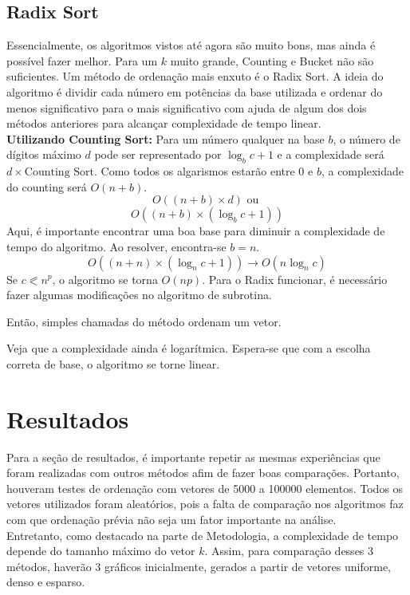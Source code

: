 \documentclass[fontsize=11pt]{article}
\begin{document}
    \subsection{Radix Sort}
        Essencialmente, os algoritmos vistos até agora são muito bons, mas ainda é possível fazer melhor.
        Para um $k$ muito grande, Counting e Bucket não são suficientes. Um método de ordenação
        mais enxuto é o Radix Sort. A ideia do algoritmo é dividir cada número em potências da 
        base utilizada e ordenar do menos significativo para o mais significativo com ajuda 
        de algum dos dois métodos anteriores para alcançar complexidade de tempo linear.
        \\ \textbf{Utilizando Counting Sort:} 
        Para um número qualquer na base $b$, o número de dígitos máximo $d$ pode ser representado 
        por $\log_bc+1$ e a complexidade será $d\times \text{Counting Sort}$. Como todos
        os algarismos estarão entre $0$ e $b$, a complexidade do counting será $O(n+b)$. 
        $$O((n+b)\times d) \text{ ou }$$ $$O((n+b)\times (\log_bc+1))$$
        Aqui, é importante encontrar uma boa base para diminuir a complexidade de tempo
        do algoritmo. Ao resolver, encontra-se $b=n$. \label{radix}
        $$O((n+n)\times (\log_nc+1)) \rightarrow O(n \log_nc)$$ Se $c \eqslantless n^{p}$, o algoritmo 
        se torna $O(np)$. \cite{mitvideo}
        Para o Radix funcionar, é necessário fazer algumas modificações no algoritmo de subrotina.
        
        Então, simples chamadas do método ordenam um vetor. 
        
        Veja que a complexidade ainda é logarítmica. Espera-se que com a escolha 
        correta de base, o algoritmo se torne linear. 

\section{Resultados}
    Para a seção de resultados, é importante repetir as mesmas experiências que foram realizadas com
    outros métodos afim de fazer boas comparações. Portanto, houveram testes de ordenação com vetores 
    de 5000 a 100000 elementos. Todos os vetores utilizados foram aleatórios, pois a falta de comparação
    nos algoritmos faz com que ordenação prévia não seja um fator importante na análise. 
    \\ Entretanto, como destacado na parte de Metodologia, a complexidade de tempo depende do 
    tamanho máximo do vetor $k$. Assim, para comparação desses 3 métodos, haverão 3 gráficos inicialmente,
    gerados a partir de vetores uniforme, denso e esparso. 
    \newpage
\end{document}
